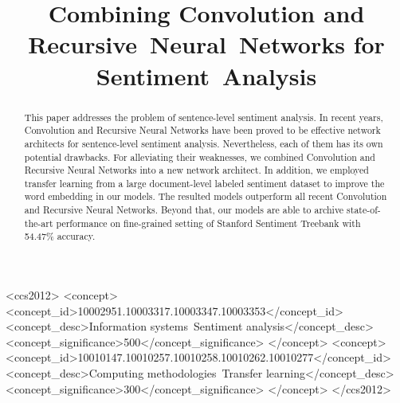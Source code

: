 \documentclass[sigconf]{acmart}
\begin{document}
\title{Combining Convolution and Recursive~Neural~Networks for Sentiment~Analysis}
%
%
%
%


\begin{abstract}
This paper addresses the problem of sentence-level sentiment analysis.
In recent years, Convolution and Recursive Neural Networks have been proved to be effective network architects for sentence-level sentiment analysis.
Nevertheless, each of them has its own potential drawbacks.
For alleviating their weaknesses, we combined Convolution and Recursive Neural Networks into a new network architect.
In addition, we employed transfer learning from a large document-level labeled sentiment dataset to improve the word embedding in our models.
The resulted models outperform all recent Convolution and Recursive Neural Networks.
Beyond that, our models are able to archive  state-of-the-art performance on fine-grained setting of Stanford Sentiment Treebank with 54.47\% accuracy. 
\end{abstract}

%
%
\begin{CCSXML}
	<ccs2012>
	<concept>
	<concept_id>10002951.10003317.10003347.10003353</concept_id>
	<concept_desc>Information systems~Sentiment analysis</concept_desc>
	<concept_significance>500</concept_significance>
	</concept>
	<concept>
	<concept_id>10010147.10010257.10010258.10010262.10010277</concept_id>
	<concept_desc>Computing methodologies~Transfer learning</concept_desc>
	<concept_significance>300</concept_significance>
	</concept>
	</ccs2012>
\end{CCSXML}





\maketitle




 
\end{document}
